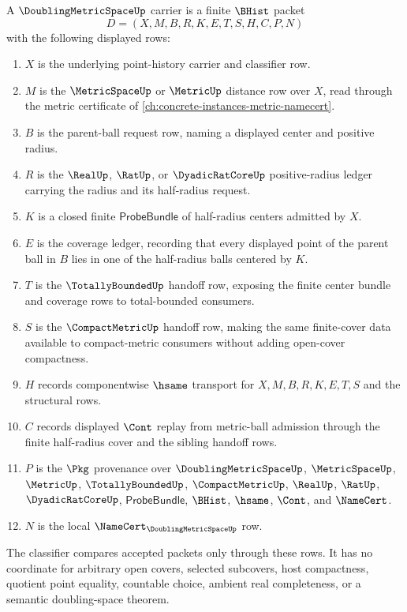 \begin{definition}
\label{def:doubling-metric-space-carrier}
A $\DoublingMetricSpaceUp$ carrier is a finite $\BHist$ packet
$$
D=(X,M,B,R,K,E,T,S,H,C,P,N)
$$
with the following displayed rows:
\begin{enumerate}
\item $X$ is the underlying point-history carrier and classifier row.
\item $M$ is the $\MetricSpaceUp$ or $\MetricUp$ distance row over $X$, read through the metric certificate of \autoref{ch:concrete-instances-metric-namecert}.
\item $B$ is the parent-ball request row, naming a displayed center and positive radius.
\item $R$ is the $\RealUp$, $\RatUp$, or $\DyadicRatCoreUp$ positive-radius ledger carrying the radius and its half-radius request.
\item $K$ is a closed finite $\mathsf{ProbeBundle}$ of half-radius centers admitted by $X$.
\item $E$ is the coverage ledger, recording that every displayed point of the parent ball in $B$ lies in one of the half-radius balls centered by $K$.
\item $T$ is the $\TotallyBoundedUp$ handoff row, exposing the finite center bundle and coverage rows to total-bounded consumers.
\item $S$ is the $\CompactMetricUp$ handoff row, making the same finite-cover data available to compact-metric consumers without adding open-cover compactness.
\item $H$ records componentwise $\hsame$ transport for $X,M,B,R,K,E,T,S$ and the structural rows.
\item $C$ records displayed $\Cont$ replay from metric-ball admission through the finite half-radius cover and the sibling handoff rows.
\item $P$ is the $\Pkg$ provenance over $\DoublingMetricSpaceUp$, $\MetricSpaceUp$, $\MetricUp$, $\TotallyBoundedUp$, $\CompactMetricUp$, $\RealUp$, $\RatUp$, $\DyadicRatCoreUp$, $\mathsf{ProbeBundle}$, $\BHist$, $\hsame$, $\Cont$, and $\NameCert$.
\item $N$ is the local $\NameCert_{\DoublingMetricSpaceUp}$ row.
\end{enumerate}
The classifier compares accepted packets only through these rows. It has no coordinate for arbitrary open covers, selected subcovers, host compactness, quotient point equality, countable choice, ambient real completeness, or a semantic doubling-space theorem.
\end{definition}

